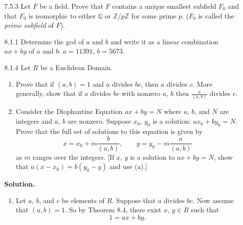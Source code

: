 \documentclass[9pt]{article}
\newcommand{\Z}{\mathbb{Z}}
\newcommand{\Q}{\mathbb{Q}}
\begin{document}
\begin{enumerate}
   \item[7.5.3]   Let $F$ be a field. Prove that $F$ contains a unique smallest
                  subfield $F_0$ and that $F_0$ is isomorphic to either $\Q$ or
                  $\Z/p\Z$ for some prime $p$. ($F_0$ is called the
                  \textit{prime subfield} of $F$).
   \item[8.1.1]   Determine the gcd of $a$ and $b$ and write it as a linear
                  combination $ax + by$ of $a$ and $b$: $a = 11391$, $b = 5673$.
   \item[8.1.4]   Let $R$ be a Euclidean Domain.
                  \begin{enumerate}
                     \item Prove that if $(a, b) = 1$ and $a$ divides $bc$, then
                           $a$ divides $c$. More generally, show that if $a$
                           divides $bc$ with nonzero $a$, $b$ then
                           $\frac{a}{(a, b)}$ divides $c$.
                     \item Consider the Diophantine Equation $ax + by = N$ where
                           $a$, $b$, and $N$ are integers and $a$, $b$ are
                           nonzero. Suppose $x_0$, $y_0$ is a solution:
                           $ax_0 + by_0 = N$. Prove that the full set of
                           solutions to this equation is given by
                           $$x = x_0 + m\frac{b}{(a, b)}, \qquad
                             y = y_0 - m\frac{a}{(a, b)}$$
                           as $m$ ranges over the integers. [If $x$, $y$ is a
                           solution to $ax + by = N$, show that
                           $a(x - x_0) = b(y_0 - y)$ and use (a).]
                  \end{enumerate}

      \textbf{Solution.}

      \begin{enumerate}
         \item Let $a$, $b$, and $c$ be elements of $R$. Suppose that $a$
               divides $bc$. Now assume that $(a, b) = 1$. So by Theorem 8.4, 
               there exist $x$, $y \in R$ such that
               \begin{equation} \label{1_1}
                  1 = ax + by.
               \end{equation}


\end{enumerate}
\end{enumerate}
\end{document}
